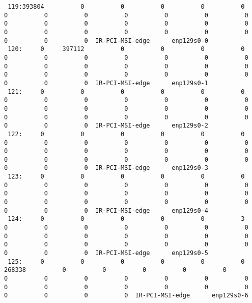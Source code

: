\begin{lstlisting}
 119:393804          0          0          0          0          0          0          0          0          0          0          0          0          0          0          0          0          0          0          0          0          0          0          0          0          0          0          0          0          0  IR-PCI-MSI-edge      enp129s0-0
 120:     0     397112          0          0          0          0          0          0          0          0          0          0          0          0          0          0          0          0          0          0          0          0          0          0          0          0          0          0          0          0  IR-PCI-MSI-edge      enp129s0-1
 121:     0          0          0          0          0          0          0          0          0          0          0          0          0          0          0          0          0          0          0          0          0          0          0          0          0          0          0          0          0          0  IR-PCI-MSI-edge      enp129s0-2
 122:     0          0          0          0          0          0          0          0          0          0          0          0          0          0          0          0          0          0          0          0          0          0          0          0          0          0          0          0          0          0  IR-PCI-MSI-edge      enp129s0-3
 123:     0          0          0          0          0          0          0          0          0          0          0          0          0          0          0          0          0          0          0          0          0          0          0          0          0          0          0          0          0          0  IR-PCI-MSI-edge      enp129s0-4
 124:     0          0          0          0          0          3          0          0          0          0          0          0          0          0          0          0          0          0          0          0          0          0          0          0          0          0          0          0          0          0  IR-PCI-MSI-edge      enp129s0-5
 125:     0          0          0          0          0          0     268338          0          0          0          0          0          0          0          0          0          0          0          0          0          0          0          0          0          0          0          0          0          0          0  IR-PCI-MSI-edge      enp129s0-6

\end{lstlisting}
